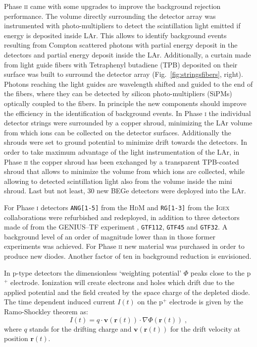 Phase \textsc{ii} came with some upgrades to improve the background rejection performance. The volume directly surrounding the detector array was instrumented with photo-multipliers to detect the scintillation light emitted if energy is deposited inside LAr. This allows to identify background events resulting from Compton scattered photons with partial energy deposit in the detectors and partial energy deposit inside the LAr. Additionally, a curtain made from light guide fibers with Tetraphenyl butadiene (TPB) deposited on their surface was built to surround the detector array (Fig.~\ref{fig:stringsfibers}, right). Photons reaching the light guides are wavelength shifted and guided to the end of the fibers, where they can be detected by silicon photo-multipliers (SiPMs) optically coupled to the fibers. In principle the new components should improve the efficiency in the identification of background events. In Phase \textsc{i} the individual detector strings were surrounded by a copper shroud, minimizing the LAr volume from which  ions can be collected on the detector surfaces. Additionally the shrouds were set to ground potential to minimize drift towards the detectors. In order to take maximum advantage of the light instrumentation of the LAr, in Phase \textsc{ii} the copper shroud has been exchanged by a transparent TPB-coated shroud that allows to minimize the volume from which  ions are collected, while allowing to detected scintillation light also from the volume inside the mini shroud. Last but not least, 30 new BEGe detectors were deployed into the LAr.

 For Phase \textsc{i} detectors \texttt{ANG[1-5]} from the \textsc{HdM} \cite{hdm} and \texttt{RG[1-3]} from the \textsc{Igex} \cite{igex} collaborations were refurbished and redeployed, in addition to three detectors made of  from the GENIUS--TF experiment \cite{genius1, genius2}, \texttt{GTF112}, \texttt{GTF45} and \texttt{GTF32}. A background level of an order of magnitude lower than in those former experiments was achieved. For Phase \textsc{ii} new material was purchased in order to produce new diodes. Another factor of ten in background reduction is envisioned.

In p-type detectors the dimensionless `weighting potential' $\Phi$ peaks close to the p$^+$ electrode. Ionization will create electrons and holes which drift due to the applied potential and the field created by the space charge of the depleted diode. The time dependent induced current $I(t)$ on the p$^+$ electrode is given by the Ramo-Shockley theorem \cite{schockley-ramo} as:
\[I(t)=q\cdot\mathbf{v}(\mathbf{r}(t))\cdot\nabla\Phi(\mathbf{r}(t))\;,\]
where $q$ stands for the drifting charge and $\mathbf{v}(\mathbf{r}(t))$ for the drift velocity at position $\mathbf{r}(t)$.

